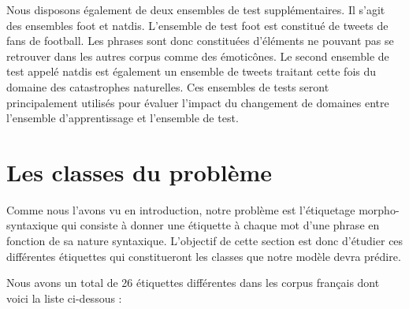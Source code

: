 \documentclass[french, 14pt]{memoir}
\begin{document}
Nous disposons également de deux ensembles de test supplémentaires. Il s'agit des ensembles foot et natdis. L'ensemble de test foot est constitué de tweets de fans de football. Les phrases sont donc constituées d'éléments ne pouvant pas se retrouver dans les autres corpus comme des émoticônes. Le second ensemble de test appelé natdis est également un ensemble de tweets traitant cette fois du domaine des catastrophes naturelles. Ces ensembles de tests seront principalement utilisés pour évaluer l'impact du changement de domaines entre l'ensemble d'apprentissage et l'ensemble de test. 

\section{Les classes du problème}

Comme nous l'avons vu en introduction, notre problème est l'étiquetage morpho-syntaxique qui consiste à donner une étiquette à chaque mot d'une phrase en fonction de sa nature syntaxique. L'objectif de cette section est donc d'étudier ces différentes étiquettes qui constitueront les classes que notre modèle devra prédire.

Nous avons un total de 26 étiquettes différentes dans les corpus français dont voici la liste ci-dessous :
\end{document}
